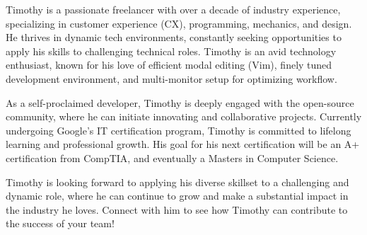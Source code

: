 
\begin{cvparagraph}
Timothy is a passionate freelancer with over a decade of industry experience, specializing in customer experience (CX), programming, mechanics, and design. He thrives in dynamic tech environments, constantly seeking opportunities to apply his skills to challenging technical roles. Timothy is an avid technology enthusiast, known for his love of efficient modal editing (Vim), finely tuned development environment, and multi-monitor setup for optimizing workflow. 

As a self-proclaimed developer, Timothy is deeply engaged with the open-source community, where he can initiate innovating and collaborative projects. Currently undergoing Google's IT certification program, Timothy is committed to lifelong learning and professional growth. His goal for his next certification will be an A+ certification from CompTIA, and eventually a Masters in Computer Science.

Timothy is looking forward to applying his diverse skillset to a challenging and dynamic role, where he can continue to grow and make a substantial impact in the industry he loves. Connect with him to see how Timothy can contribute to the success of your team!
\end{cvparagraph}
